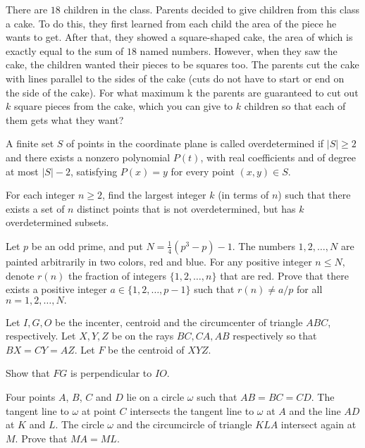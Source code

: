 \documentclass[11pt]{scrartcl}
\begin{document}
\begin{problem}[208479683430579745]
	There are $18$ children in the class. Parents decided to give children from this class a cake. To do this, they first learned from each child the area of the piece he wants to get. After that, they showed a square-shaped cake, the area of which is exactly equal to the sum of $18$ named numbers. However, when they saw the cake, the children wanted their pieces to be squares too. The parents cut the cake with lines parallel to the sides of the cake (cuts do not have to start or end on the side of the cake). For what maximum k the parents are guaranteed to cut out $k$ square pieces from the cake, which you can give to $k$ children so that each of them gets what they want?
\end{problem}
\begin{problem}[244533208775214844]
A finite set $S$ of points in the coordinate plane is called overdetermined if $|S|\ge 2$ and there exists a nonzero polynomial $P(t)$, with real coefficients and of degree at most $|S|-2$, satisfying $P(x)=y$ for every point $(x,y)\in S$.

For each integer $n\ge 2$, find the largest integer $k$ (in terms of $n$) such that there exists a set of $n$ distinct points that is not overdetermined, but has $k$ overdetermined subsets.
\end{problem}
\begin{problem}[47893544380608]
	Let $p$ be an odd prime, and put $N=\frac{1}{4} (p^3 -p) -1.$ The numbers $1,2, \dots, N$ are painted arbitrarily in two colors, red and blue. For any positive integer $n \leqslant N,$ denote $r(n)$ the fraction of integers $\{ 1,2, \dots, n \}$ that are red.
Prove that there exists a positive integer $a \in \{ 1,2, \dots, p-1\}$ such that $r(n) \neq a/p$ for all $n = 1,2, \dots , N.$
\end{problem}
\begin{problem}[6734490609685717062]
	Let $I,G,O$ be the incenter, centroid and the circumcenter of triangle $ABC$, respectively. Let $X,Y,Z$ be on the rays $BC, CA, AB$ respectively so that $BX=CY=AZ$. Let $F$ be the centroid of $XYZ$.

Show that $FG$ is perpendicular to $IO$.
\end{problem}
\begin{problem}[2153848747665754338]
	Four points $A$, $B$, $C$ and $D$ lie on a circle $\omega$ such that $AB=BC=CD$. The tangent line to $\omega$ at point $C$ intersects the tangent line to $\omega$ at $A$ and the line $AD$ at $K$ and $L$. The circle $\omega$ and the circumcircle of triangle $KLA$ intersect again at $M$. Prove that $MA=ML$.
\end{problem}
\end{document}
